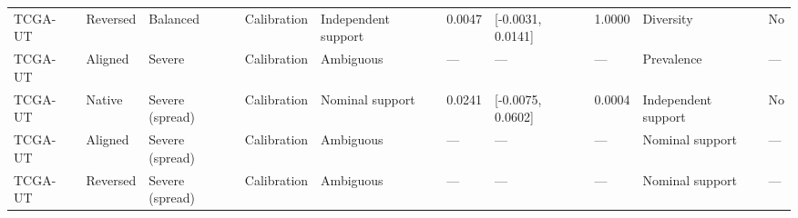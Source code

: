 \begin{longtable}{llllllllll}
TCGA-UT & Reversed & Balanced & Calibration & Independent support & 0.0047 & [-0.0031, 0.0141] & 1.0000 & Diversity & No \\
TCGA-UT & Aligned & Severe & Calibration & Ambiguous & --- & --- & --- & Prevalence & --- \\
TCGA-UT & Native & Severe (spread) & Calibration & Nominal support & 0.0241 & [-0.0075, 0.0602] & 0.0004 & Independent support & No \\
TCGA-UT & Aligned & Severe (spread) & Calibration & Ambiguous & --- & --- & --- & Nominal support & --- \\
TCGA-UT & Reversed & Severe (spread) & Calibration & Ambiguous & --- & --- & --- & Nominal support & --- \\
\end{longtable}
